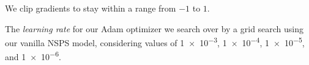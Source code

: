 \documentclass{article}
\begin{document}
We clip gradients to stay within a range from $-1$ to $1$.




The \emph{learning rate} for our Adam optimizer we search over
by a grid search using our vanilla NSPS model, considering
values of \num{1e-3}, \num{1e-4}, \num{1e-5}, and \num{1e-6}.
\end{document}
